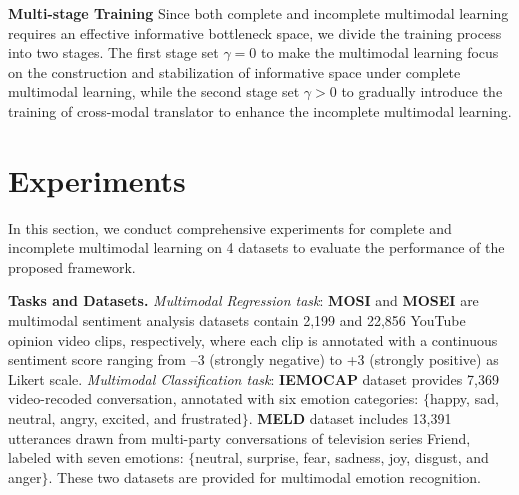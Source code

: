 \documentclass{article}
\begin{document}
\textbf{Multi-stage Training} 
Since both complete and incomplete multimodal learning requires an effective informative bottleneck space, we divide the training process into two stages. The first stage set $\gamma=0$ to make the multimodal learning focus on the construction and stabilization of informative space under complete multimodal learning, while the second stage set $\gamma>0$ to gradually introduce the training of cross-modal translator to enhance the incomplete multimodal learning. 

\section{Experiments}
\label{experiments}
In this section, we conduct comprehensive experiments for complete and incomplete multimodal learning on 4 datasets to evaluate the performance of the proposed framework.

\textbf{Tasks and Datasets.} \textit{Multimodal Regression task}: \textbf{MOSI} and \textbf{MOSEI} are multimodal sentiment analysis datasets contain 2,199 and 22,856 YouTube opinion video clips, respectively, where each clip is annotated with a continuous sentiment score ranging from –3 (strongly negative) to +3 (strongly positive) as Likert scale. \textit{Multimodal Classification task}: \textbf{IEMOCAP} dataset provides 7,369 video-recoded conversation, annotated with six emotion categories: $\{$happy, sad, neutral, angry, excited, and frustrated$\}$.  \textbf{MELD} dataset includes 13,391 utterances drawn from multi-party conversations of television series Friend, labeled with seven emotions: $\{$neutral, surprise, fear, sadness, joy, disgust, and anger$\}$. These two datasets are provided for multimodal emotion recognition.
\end{document}

